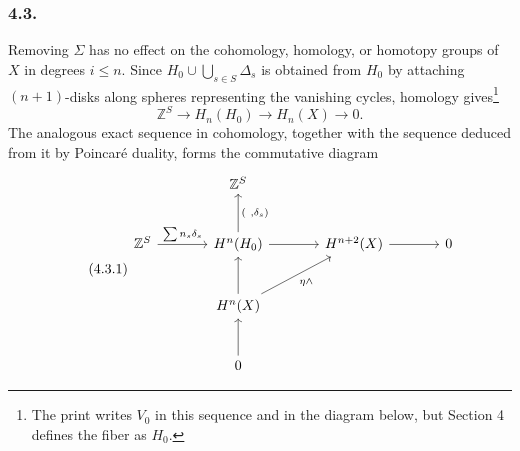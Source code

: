 \subsubsection*{4.3.}
Removing $\Sigma$ has no effect on the cohomology, homology, or homotopy
groups of $X$ in degrees $i\leq n$.  Since
$H_0\cup\bigcup_{s\in S}\Delta_s$ is obtained from $H_0$ by attaching
$(n+1)$-disks along spheres representing the vanishing cycles, homology
gives\footnote{The print writes $V_0$ in this sequence and in the diagram
below, but Section 4 defines the fiber as $H_0$.}
\[
 \mathbb Z^S\longrightarrow H_n(H_0)\longrightarrow H_n(X)
 \longrightarrow0.
\]
The analogous exact sequence in cohomology, together with the sequence
deduced from it by Poincar\'e duality, forms the commutative diagram
\begin{equation}\tag{4.3.1}
\begin{tikzcd}[row sep=large,column sep=large]
{} & \mathbb Z^S & {} & {} \\
\mathbb Z^S \arrow[r,"{\sum n_s\delta_s}"] &
H^n(H_0) \arrow[u,"{(\ ,\delta_s)}"'] \arrow[r] &
H^{n+2}(X) \arrow[r] & 0 \\
{} & H^n(X) \arrow[u] \arrow[ur,"{\eta\wedge}"'] & {} & {} \\
{} & 0 \arrow[u] & {} & {}
\end{tikzcd}
\end{equation}
